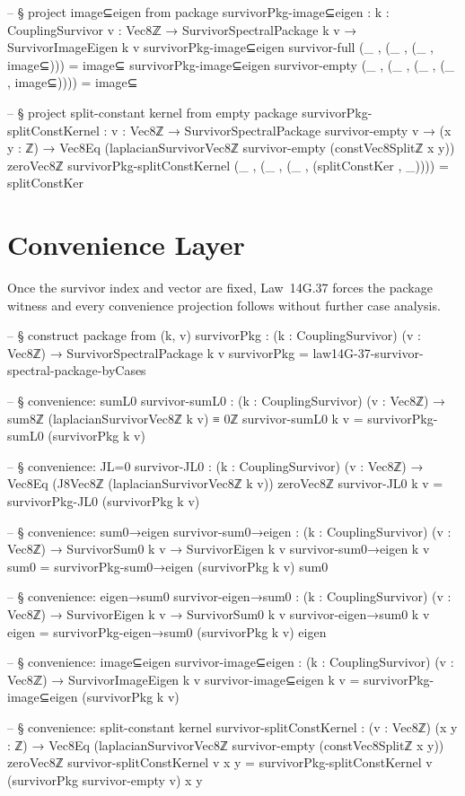 \documentclass[11pt,a4paper]{book}
\begin{document}
\begin{code}
-- § project image⊆eigen from package
survivorPkg-image⊆eigen : {k : CouplingSurvivor} {v : Vec8ℤ} →
  SurvivorSpectralPackage k v → SurvivorImageEigen k v
survivorPkg-image⊆eigen {survivor-full} (_ , (_ , (_ , image⊆))) = image⊆
survivorPkg-image⊆eigen {survivor-empty} (_ , (_ , (_ , (_ , image⊆)))) = image⊆

-- § project split-constant kernel from empty package
survivorPkg-splitConstKernel : {v : Vec8ℤ} →
  SurvivorSpectralPackage survivor-empty v → (x y : ℤ) →
  Vec8Eq (laplacianSurvivorVec8ℤ survivor-empty (constVec8Splitℤ x y)) zeroVec8ℤ
survivorPkg-splitConstKernel (_ , (_ , (_ , (splitConstKer , _)))) = splitConstKer
\end{code}

\section{Convenience Layer}

Once the survivor index and vector are fixed, Law~14G.37 forces the package witness and every convenience projection follows without further case analysis.

\begin{code}
-- § construct package from (k, v)
survivorPkg : (k : CouplingSurvivor) (v : Vec8ℤ) → SurvivorSpectralPackage k v
survivorPkg = law14G-37-survivor-spectral-package-byCases

-- § convenience: sumL0
survivor-sumL0 : (k : CouplingSurvivor) (v : Vec8ℤ) → sum8ℤ (laplacianSurvivorVec8ℤ k v) ≡ 0ℤ
survivor-sumL0 k v = survivorPkg-sumL0 (survivorPkg k v)

-- § convenience: JL=0
survivor-JL0 : (k : CouplingSurvivor) (v : Vec8ℤ) → Vec8Eq (J8Vec8ℤ (laplacianSurvivorVec8ℤ k v)) zeroVec8ℤ
survivor-JL0 k v = survivorPkg-JL0 (survivorPkg k v)

-- § convenience: sum0→eigen
survivor-sum0→eigen : (k : CouplingSurvivor) (v : Vec8ℤ) → SurvivorSum0 k v → SurvivorEigen k v
survivor-sum0→eigen k v sum0 = survivorPkg-sum0→eigen (survivorPkg k v) sum0

-- § convenience: eigen→sum0
survivor-eigen→sum0 : (k : CouplingSurvivor) (v : Vec8ℤ) → SurvivorEigen k v → SurvivorSum0 k v
survivor-eigen→sum0 k v eigen = survivorPkg-eigen→sum0 (survivorPkg k v) eigen

-- § convenience: image⊆eigen
survivor-image⊆eigen : (k : CouplingSurvivor) (v : Vec8ℤ) → SurvivorImageEigen k v
survivor-image⊆eigen k v = survivorPkg-image⊆eigen (survivorPkg k v)

-- § convenience: split-constant kernel
survivor-splitConstKernel : (v : Vec8ℤ) (x y : ℤ) →
  Vec8Eq (laplacianSurvivorVec8ℤ survivor-empty (constVec8Splitℤ x y)) zeroVec8ℤ
survivor-splitConstKernel v x y = survivorPkg-splitConstKernel {v} (survivorPkg survivor-empty v) x y
\end{code}
\end{document}
